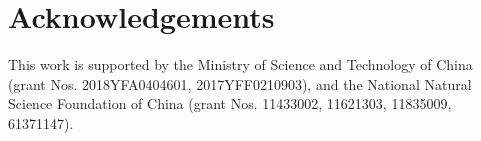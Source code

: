 \documentclass[letters,a4paper,fleqn,usenatbib]{mnras}
\begin{document}
\section*{Acknowledgements}

This work is supported by
the Ministry of Science and Technology of China
(grant Nos. 2018YFA0404601, 2017YFF0210903),
and the National Natural Science Foundation of China
(grant Nos. 11433002, 11621303, 11835009, 61371147).










\bsp	%
\label{lastpage}
\end{document}
